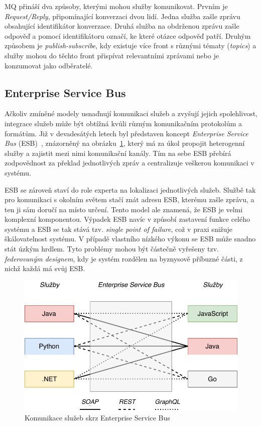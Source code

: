 MQ přináší dva způsoby, kterými mohou služby komunikovat. Prvním je
\textit{Request/Reply}, připomínající konverzaci dvou lidí. Jedna
služba zašle zprávu obsahující identifikátor konverzace. Druhá služba
na obdrženou zprávu zašle odpověď a pomocí identifikátoru označí,
ke které otázce odpověď patří. Druhým způsobem je \textit{publish-subscribe},
kdy existuje více front s různými tématy (\textit{topics}) a služby mohou
do těchto front přispívat relevantními zprávami nebo je konzumovat jako odběratelé.

\subsection{Enterprise Service Bus}

Ačkoliv zmíněné modely usnaďnují komunikaci služeb a zvyšují jejich
spolehlivost, integrace služeb může být obtížná kvůli různým
komunikačním protokolům a formátům. Již v devadesátých letech
byl představen koncept \textit{Enterprise Service
Bus} (ESB)~\cite{chappell2004enterprise},
znázorněný na obrázku~\ref{fig:enterprise-service-bus},
který má za úkol propojit heterogenní služby a zajistit mezi nimi
komunikační kanály. Tím na sebe ESB přebírá zodpovědnost za překlad
jednotlivých zpráv a centralizuje veškerou komunikaci v systému.

ESB se zároveň staví do role experta na lokalizaci jednotlivých služeb.
Službě tak pro komunikaci s okolním světem stačí znát adresu ESB, kterému
zašle zprávu, a ten ji sám doručí na místo určení. Tento model ale
znamená, že ESB je velmi komplexní komponentou. Výpadek ESB navíc
v způsobí zastavení funkce celého systému a ESB se tak stává
tzv. \textit{single point of failure}, což v praxi snižuje škálovatelnost systému.
V případě vlastního nízkého výkonu se ESB může snadno stát úzkým hrdlem.
Tyto problémy mohou být částečně vyřešeny tzv. \textit{federovaným designem},
kdy je systém rozdělen na byznysově příbuzné části, z nichž každá má
svůj ESB.

\begin{figure}
    \centering
    \includegraphics[keepaspectratio=true, width=0.7\linewidth]{figures/enterprise-service-bus.pdf}
    \caption{Komunikace služeb skrz Enterprise Service Bus}
    \label{fig:enterprise-service-bus}
\end{figure}

